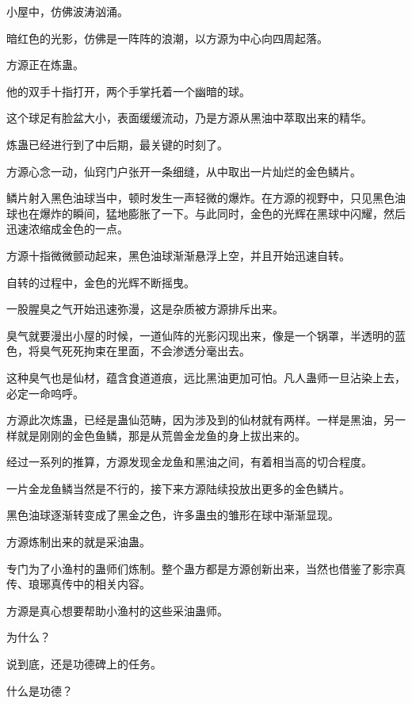 
\begin{this_body}



小屋中，仿佛波涛汹涌。

暗红色的光影，仿佛是一阵阵的浪潮，以方源为中心向四周起落。

方源正在炼蛊。

他的双手十指打开，两个手掌托着一个幽暗的球。

这个球足有脸盆大小，表面缓缓流动，乃是方源从黑油中萃取出来的精华。

炼蛊已经进行到了中后期，最关键的时刻了。

方源心念一动，仙窍门户张开一条细缝，从中取出一片灿烂的金色鳞片。

鳞片射入黑色油球当中，顿时发生一声轻微的爆炸。在方源的视野中，只见黑色油球也在爆炸的瞬间，猛地膨胀了一下。与此同时，金色的光辉在黑球中闪耀，然后迅速浓缩成金色的一点。

方源十指微微颤动起来，黑色油球渐渐悬浮上空，并且开始迅速自转。

自转的过程中，金色的光辉不断摇曳。

一股腥臭之气开始迅速弥漫，这是杂质被方源排斥出来。

臭气就要漫出小屋的时候，一道仙阵的光影闪现出来，像是一个锅罩，半透明的蓝色，将臭气死死拘束在里面，不会渗透分毫出去。

这种臭气也是仙材，蕴含食道道痕，远比黑油更加可怕。凡人蛊师一旦沾染上去，必定一命呜呼。

方源此次炼蛊，已经是蛊仙范畴，因为涉及到的仙材就有两样。一样是黑油，另一样就是刚刚的金色鱼鳞，那是从荒兽金龙鱼的身上拔出来的。

经过一系列的推算，方源发现金龙鱼和黑油之间，有着相当高的切合程度。

一片金龙鱼鳞当然是不行的，接下来方源陆续投放出更多的金色鳞片。

黑色油球逐渐转变成了黑金之色，许多蛊虫的雏形在球中渐渐显现。

方源炼制出来的就是采油蛊。

专门为了小渔村的蛊师们炼制。整个蛊方都是方源创新出来，当然也借鉴了影宗真传、琅琊真传中的相关内容。

方源是真心想要帮助小渔村的这些采油蛊师。

为什么？

说到底，还是功德碑上的任务。

什么是功德？


\end{this_body}
